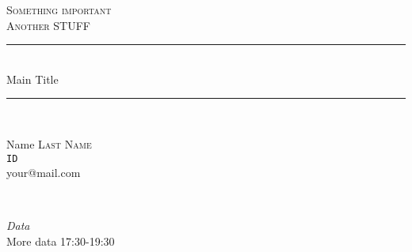 \begin{titlepage}

\newcommand{\HRule}{\rule{\linewidth}{0.7mm}}

\center 
 

\textsc{\Huge Something important}\\[2.5cm] 
\textsc{\LARGE Another STUFF}\\[3cm]



\HRule \\[1cm]
{\fontsize{55}{60}\selectfont \sffamily Main Title}\\[0.6cm] 
\HRule \\[8.2cm]
 


\begin{minipage}{0.4\textwidth}
\begin{flushleft} \large
Name \textsc{Last Name}\\ %
\texttt{ID}\\
your@mail.com
\end{flushleft}
\end{minipage}
~
\begin{minipage}{0.4\textwidth}
\begin{flushright} \large
\emph{Data} \\
More data 17:30-19:30
\end{flushright}
\end{minipage}\\[4cm]


\end{titlepage}
